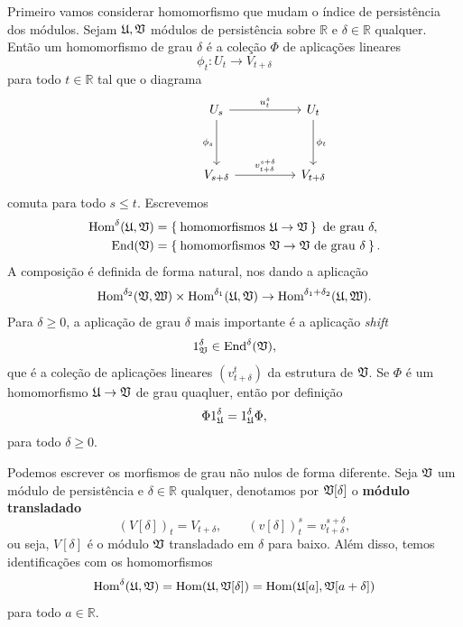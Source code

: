 Primeiro vamos considerar homomorfismo que mudam o índice de persistência dos módulos. 
Sejam $\mathfrak{U}, \mathfrak{V}$ módulos de persistência sobre $\mathbb{R}$ e $\delta \in \mathbb{R}$
qualquer. Então um homomorfismo de grau $\delta$ é a coleção $\Phi$ de aplicações lineares
\begin{equation*}
    \phi_t \colon U_t \to V_{t+\delta}
\end{equation*}
para todo $t \in \mathbb{R}$ tal que o diagrama 
\begin{equation*}
    \begin{tikzcd}[row sep=huge, column sep = huge]
        & U_s \rar{u_t^s} \dar[swap]{\phi_s} & U_t \dar{\phi_t} \\
        & V_{s+\delta} \rar{v^{s+\delta}_{t+\delta}} & V_{t+\delta}
    \end{tikzcd}
\end{equation*}
comuta para todo $s \leq t$. Escrevemos 
\begin{align*}
    \text{Hom}^\delta(\mathfrak{U}, \mathfrak{V}) &= \Set{\text{homomorfismos } \mathfrak{U} \to \mathfrak{V}}
    \text{ de grau } \delta, \\
    \text{End}(\mathfrak{V}) &= \Set{\text{homomorfismos } \mathfrak{V} \to \mathfrak{V}\text{ de grau } \delta}.
\end{align*}
A composição é definida de forma natural, nos dando a aplicação
\begin{equation*}
    \text{Hom}^{\delta_2}(\mathfrak{V}, \mathfrak{W}) \times \text{Hom}^{\delta_1}(\mathfrak{U}, \mathfrak{V}) 
    \to \text{Hom}^{\delta_1 + \delta_2}(\mathfrak{U}, \mathfrak{W}).
\end{equation*}
Para $\delta \geq 0$, a aplicação de grau $\delta$ mais importante é a aplicação
\textit{shift}
\begin{equation*}
    1^\delta_{\mathfrak{V}} \in\text{End}^\delta(\mathfrak{V}),
\end{equation*}
que é a coleção de aplicações lineares $(v_{t+\delta}^t)$ da estrutura de $\mathfrak{V}$. Se $\Phi$ 
é um homomorfismo $\mathfrak{U} \to \mathfrak{V}$ de grau quaqluer, então por definição 
\begin{equation*}
    \Phi 1_{\mathfrak{U}}^\delta = 1_{\mathfrak{U}}^\delta \Phi,
\end{equation*}
para todo $\delta \geq 0$. 

\begin{obs}
Podemos escrever os morfismos de grau não nulos de forma diferente. Seja $\mathfrak{V}$ um módulo
de persistência e $\delta \in \mathbb{R}$ qualquer, denotamos por $\mathfrak{V}[\delta]$ o 
\textbf{módulo transladado} 
\begin{equation*}
    (V[\delta])_t = V_{t+\delta}, \qquad (v[\delta])^s_t = v^{s+\delta}_{t+\delta},
\end{equation*}
ou seja, $V[\delta]$ é o módulo $\mathfrak{V}$ transladado em $\delta$ para baixo. Além disso,
temos identificações com os homomorfismos
\begin{equation*}
    \text{Hom}^\delta(\mathfrak{U}, \mathfrak{V}) = \text{Hom}(\mathfrak{U}, \mathfrak{V}[\delta]) 
    = \text{Hom}(\mathfrak{U}[a], \mathfrak{V}[a+\delta])
\end{equation*}
para todo $a \in \mathbb{R}$. 
\end{obs}

